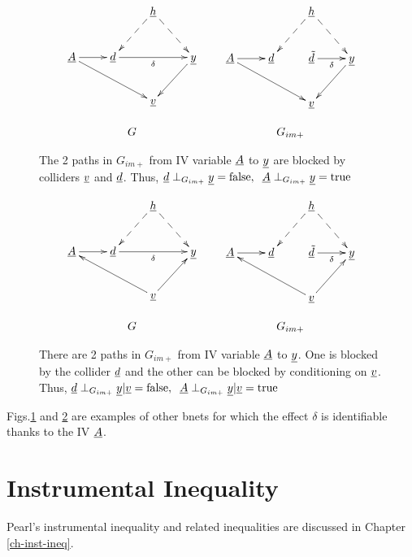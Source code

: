 \begin{figure}[h!]
$$
\begin{array}{ccc}
\xymatrix{
&&\rvh\ar@{-->}[dl]\ar@{-->}[dr]
\\
\rvA\ar[r]\ar[drr]
&\rvd\ar[rr]_\delta
&&\rvy\ar[dl]
\\
&&\rvv
}
&&
\xymatrix{
&&\rvh\ar@{-->}[dl]\ar@{-->}[dr]
\\
\rvA\ar[r]\ar[drr]
&\rvd&
\rvtd\ar[r]_\delta
&\rvy\ar[dl]
\\
&&\rvv
}
\\
\\
G&&G_{im+}
\end{array}
$$
\caption{The 2 paths in $G_{im+}$
from
IV variable ${\underline{A}}$
to ${\underline{y}}$ are blocked by colliders ${\underline{v}}$ 
and ${\underline{d}}$. Thus,
$
{\underline{d}}\perp_{G_{im+}} {\underline{y}} =\text{false}, 
\;\; {\underline{A}}\perp_{G_{im+}} {\underline{y}}= \text{true}
$
}
\label{fig-iv-G-im-blocked}
\end{figure}




\begin{figure}[h!]
$$
\begin{array}{ccc}
\xymatrix{
&&\rvh\ar@{-->}[dl]\ar@{-->}[dr]
\\
\rvA\ar[r]
&\rvd\ar[rr]_\delta
&&\rvy
\\
&&\rvv\ar[ur]\ar[ull]
}
&&
\xymatrix{
&&\rvh\ar@{-->}[dl]\ar@{-->}[dr]
\\
\rvA\ar[r]
&\rvd
&
\rvtd\ar[r]_\delta
&\rvy
\\
&&\rvv\ar[ur]\ar[ull]
}
\\
\\
G&&G_{im+}
\end{array}
$$
\caption{
There are 2 paths in $G_{im+}$
from
IV variable ${\underline{A}}$
to ${\underline{y}}$. One is
blocked
by the collider ${\underline{d}}$
and the other
can be blocked by 
conditioning on ${\underline{v}}$. Thus,
$
{\underline{d}}\perp_{G_{im+}} {\underline{y}}|{\underline{v}} =\text{false}, 
\;\; {\underline{A}}\perp_{G_{im+}} {\underline{y}}|{\underline{v}}= \text{true}
$
}
\label{fig-iv-G-im-strata}
\end{figure}

Figs.\ref{fig-iv-G-im-blocked}
and \ref{fig-iv-G-im-strata}
are examples of 
other bnets 
for which the
effect $\delta$
is identifiable
thanks
to the
IV ${\underline{A}}$.


\section{Instrumental Inequality}
Pearl's instrumental inequality
and related inequalities are discussed in
 Chapter
 \ref{ch-inst-ineq}.


